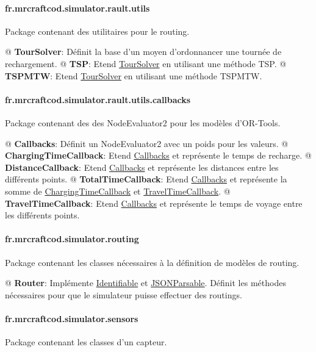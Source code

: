 \documentclass[final]{polytech/polytech}
\newcommand{\class}[1]{\textbf{#1}\label{class:#1}}
\newcommand{\klass}[1]{\hyperref[class:#1]{#1}}
\begin{document}
			\paragraph{fr.mrcraftcod.simulator.rault.utils}
				Package contenant des utilitaires pour le routing.
				
				\begin{easylist}
					@ \class{TourSolver}: Définit la base d'un moyen d'ordonnancer une tournée de rechargement.
					@ \class{TSP}: Etend \klass{TourSolver} en utilisant une méthode TSP.
					@ \class{TSPMTW}: Etend \klass{TourSolver} en utilisant une méthode TSPMTW.
				\end{easylist}
				
			\paragraph{fr.mrcraftcod.simulator.rault.utils.callbacks}
				Package contenant des des NodeEvaluator2 pour les modèles d'OR-Tools.
				
				\begin{easylist}
					@ \class{Callbacks}: Définit un NodeEvaluator2 avec un poids pour les valeurs.
					@ \class{ChargingTimeCallback}: Etend \klass{Callbacks} et représente le temps de recharge.
					@ \class{DistanceCallback}: Etend \klass{Callbacks} et représente les distances entre les différents points.
					@ \class{TotalTimeCallback}: Etend \klass{Callbacks} et représente la somme de \klass{ChargingTimeCallback} et \klass{TravelTimeCallback}.
					@ \class{TravelTimeCallback}: Etend \klass{Callbacks} et représente le temps de voyage entre les différents points.
				\end{easylist}
				
			\paragraph{fr.mrcraftcod.simulator.routing}
				Package contenant les classes nécessaires à la définition de modèles de routing.
				
				\begin{easylist}
					@ \class{Router}: Implémente \klass{Identifiable} et \klass{JSONParsable}. 
					Définit les méthodes nécessaires pour que le simulateur puisse effectuer des routings.
				\end{easylist}
				
			\paragraph{fr.mrcraftcod.simulator.sensors}
				Package contenant les classes d'un capteur.
				
\end{document}
